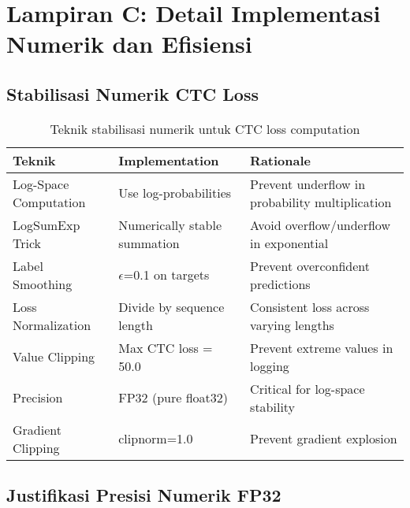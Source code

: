 \documentclass[12pt,a4paper]{article}
\begin{document}

\section{Lampiran C: Detail Implementasi Numerik dan Efisiensi}
\label{appendix:implementation-details}

\subsection{Stabilisasi Numerik CTC Loss}

\begin{table}[H]
\centering
\caption{Teknik stabilisasi numerik untuk CTC loss computation}
\label{tab:appendix-ctc-stabilization}
\small
\begin{tabular}{|l|l|p{6.5cm}|}
\hline
\textbf{Teknik} & \textbf{Implementation} & \textbf{Rationale} \\ \hline
Log-Space Computation & Use log-probabilities & Prevent underflow in probability multiplication \\ \hline
LogSumExp Trick & Numerically stable summation & Avoid overflow/underflow in exponential \\ \hline
Label Smoothing & $\epsilon$=0.1 on targets & Prevent overconfident predictions \\ \hline
Loss Normalization & Divide by sequence length & Consistent loss across varying lengths \\ \hline
Value Clipping & Max CTC loss = 50.0 & Prevent extreme values in logging \\ \hline
Precision & FP32 (pure float32) & Critical for log-space stability \\ \hline
Gradient Clipping & clipnorm=1.0 & Prevent gradient explosion \\ \hline
\end{tabular}
\end{table}

\subsection{Justifikasi Presisi Numerik FP32}
\end{document}
